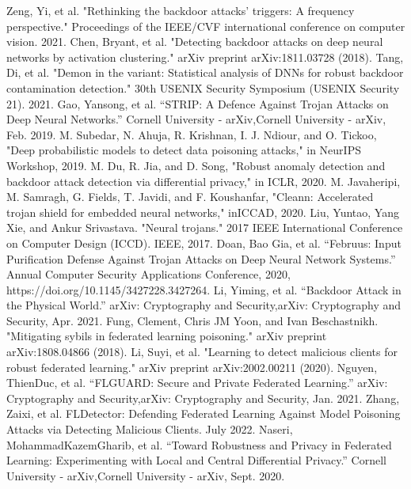 \documentclass[conference]{IEEEtran}
\begin{document}
\begin{thebibliography}{00}
     Zeng, Yi, et al. "Rethinking the backdoor attacks' triggers: A frequency perspective." Proceedings of the IEEE/CVF international conference on computer vision. 2021.
     Chen, Bryant, et al. "Detecting backdoor attacks on deep neural networks by activation clustering." arXiv preprint arXiv:1811.03728 (2018).
     Tang, Di, et al. "Demon in the variant: Statistical analysis of {DNNs} for robust backdoor contamination detection." 30th USENIX Security Symposium (USENIX Security 21). 2021.
     Gao, Yansong, et al. “STRIP: A Defence Against Trojan Attacks on Deep Neural Networks.” Cornell University - arXiv,Cornell University - arXiv, Feb. 2019.
     M. Subedar, N. Ahuja, R. Krishnan, I. J. Ndiour, and O. Tickoo, "Deep probabilistic models to detect data poisoning attacks," in NeurIPS Workshop, 2019.
     M. Du, R. Jia, and D. Song, "Robust anomaly detection and backdoor attack detection via differential privacy," in ICLR, 2020.
     M. Javaheripi, M. Samragh, G. Fields, T. Javidi, and F. Koushanfar, "Cleann: Accelerated trojan shield for embedded neural networks," inICCAD, 2020.
     Liu, Yuntao, Yang Xie, and Ankur Srivastava. "Neural trojans." 2017 IEEE International Conference on Computer Design (ICCD). IEEE, 2017.
     Doan, Bao Gia, et al. “Februus: Input Purification Defense Against Trojan Attacks on Deep Neural Network Systems.” Annual Computer Security Applications Conference, 2020, https://doi.org/10.1145/3427228.3427264.
     Li, Yiming, et al. “Backdoor Attack in the Physical World.” arXiv: Cryptography and Security,arXiv: Cryptography and Security, Apr. 2021.
     Fung, Clement, Chris JM Yoon, and Ivan Beschastnikh. "Mitigating sybils in federated learning poisoning." arXiv preprint arXiv:1808.04866 (2018).
     Li, Suyi, et al. "Learning to detect malicious clients for robust federated learning." arXiv preprint arXiv:2002.00211 (2020).
     Nguyen, ThienDuc, et al. “FLGUARD: Secure and Private Federated Learning.” arXiv: Cryptography and Security,arXiv: Cryptography and Security, Jan. 2021.
     Zhang, Zaixi, et al. FLDetector: Defending Federated Learning Against Model Poisoning Attacks via Detecting Malicious Clients. July 2022.
     Naseri, MohammadKazemGharib, et al. “Toward Robustness and Privacy in Federated Learning: Experimenting with Local and Central Differential Privacy.” Cornell University - arXiv,Cornell University - arXiv, Sept. 2020.

\end{thebibliography}
\end{document}
